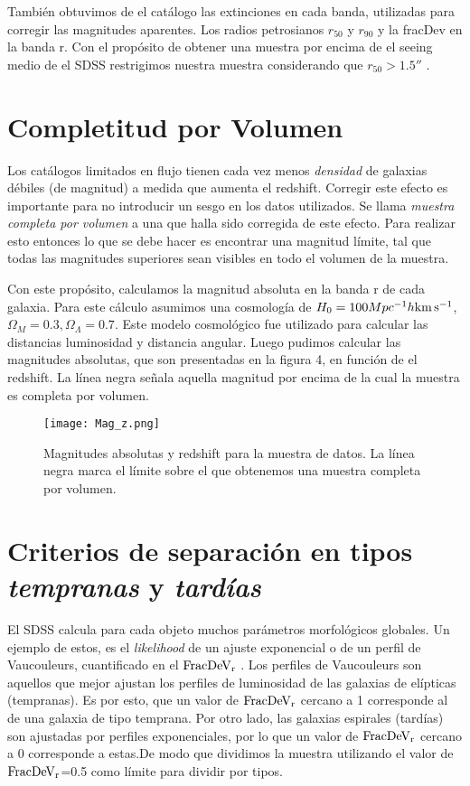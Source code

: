 \documentclass[a4paper,10pt]{article}
\newcommand{\kms}{{\rm km\,s^{-1}}}
\newcommand{\fdev}{\rm FracDeV_{r}}
\begin{document}
Tambi\'en obtuvimos de el cat\'alogo las extinciones en cada banda, utilizadas para corregir las magnitudes aparentes. Los radios petrosianos $r_{50}$ y $r_{90}$ y la fracDev en la banda r. Con el prop\'osito de obtener una muestra por encima de el seeing medio de el SDSS restrigimos nuestra muestra considerando que $r_{50} > 1.5''$ \citep{Shen2003}.

\section{Completitud por Volumen}
Los cat\'alogos limitados en flujo tienen cada vez menos \textit{densidad} de galaxias d\'ebiles (de magnitud) a medida que aumenta el redshift. Corregir este efecto es importante para no introducir un sesgo en los datos utilizados. Se llama \textit{muestra completa por volumen} a una que halla sido corregida de este efecto. Para realizar esto entonces lo que se debe hacer es encontrar una magnitud l\'imite, tal que todas las magnitudes superiores sean visibles en todo el volumen de la muestra. 



Con este prop\'osito, calculamos la magnitud absoluta en la banda r de cada galaxia. Para este c\'alculo asumimos una cosmolog\'ia de $H_{0}=100Mpc^{-1}h\kms$, $\Omega_{M}=0.3, \Omega_{\Lambda}=0.7$.
Este modelo cosmol\'ogico fue utilizado para calcular las distancias luminosidad y distancia angular. Luego pudimos calcular las magnitudes absolutas, que son presentadas en la figura 4, en funci\'on de el redshift. La l\'inea negra se\~nala aquella magnitud por encima de la cual la muestra es completa por volumen. \begin{figure}[h]
 \centering
 \texttt{[image: Mag\_z.png]}
 \caption{Magnitudes absolutas y redshift para la muestra de datos. La l\'inea negra marca el l\'imite sobre el que obtenemos una muestra completa por volumen.}
 \label{fig: 4}
\end{figure}
\section{Criterios de separaci\'on en tipos \textit{tempranas} y \textit{tard\'ias}}



El SDSS calcula para cada objeto muchos par\'ametros morfol\'ogicos globales. Un ejemplo de estos, es el \textit{likelihood} de un ajuste exponencial o de un perfil de Vaucouleurs, cuantificado en el $\fdev$ \citep{Strateva2001}. Los perfiles de Vaucouleurs son aquellos que mejor ajustan los perfiles de luminosidad de las galaxias de el\'ipticas (tempranas). Es por esto, que un valor de $\fdev$ cercano a 1 corresponde al de una galaxia de tipo temprana. Por otro lado, las galaxias espirales (tard\'ias) son ajustadas por perfiles exponenciales, por lo que un valor de $\fdev$ cercano a 0 corresponde a estas.De modo que dividimos la muestra utilizando el valor de $\fdev$=0.5 como l\'imite para dividir por tipos.
\end{document}
